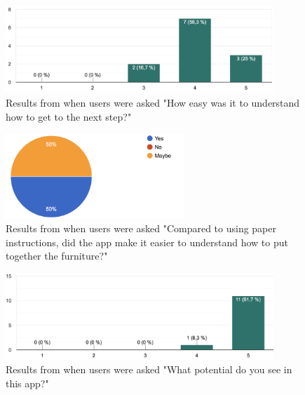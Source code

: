 \begin{figure}[hbtp]
\begin{center}
\includegraphics[width = 0.9\textwidth]{./Images/easyToUse.png}
\caption{Results from when users were asked "How easy was it to understand how to get to the next step?"}
\label{fig:question4}
\end{center}
\end{figure}

\begin{figure}[hbtp]
\begin{center}
\includegraphics[width = 0.6\textwidth]{./Images/comparedTo.png}
\caption{Results from when users were asked "Compared to using paper instructions, did the app make it easier to understand how to put together the furniture?"}
\label{fig:question5}
\end{center}
\end{figure}

\begin{figure}[hbtp]
\begin{center}
\includegraphics[width = 0.9\textwidth]{./Images/potential.png}
\caption{Results from when users were asked "What potential do you see in this app?"}
\label{fig:question6}
\end{center}
\end{figure}


